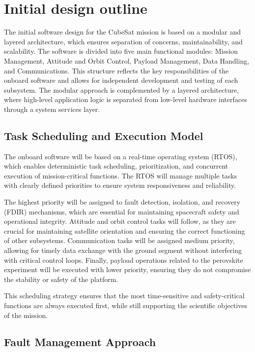 \section{Initial design outline}

The initial software design for the CubeSat mission is based on a modular and layered architecture, which ensures separation of concerns, maintainability, and scalability. The software is divided into five main functional modules: Mission Management, Attitude and Orbit Control, Payload Management, Data Handling, and Communications. This structure reflects the key responsibilities of the onboard software and allows for independent development and testing of each subsystem. The modular approach is complemented by a layered architecture, where high-level application logic is separated from low-level hardware interfaces through a system services layer.

\subsection{Task Scheduling and Execution Model}

The onboard software will be based on a real-time operating system (RTOS), which enables deterministic task scheduling, prioritization, and concurrent execution of mission-critical functions. The RTOS will manage multiple tasks with clearly defined priorities to ensure system responsiveness and reliability.

The highest priority will be assigned to fault detection, isolation, and recovery (FDIR) mechanisms, which are essential for maintaining spacecraft safety and operational integrity. Attitude and orbit control tasks will follow, as they are crucial for maintaining satellite orientation and ensuring the correct functioning of other subsystems. Communication tasks will be assigned medium priority, allowing for timely data exchange with the ground segment without interfering with critical control loops. Finally, payload operations related to the perovskite experiment will be executed with lower priority, ensuring they do not compromise the stability or safety of the platform.

This scheduling strategy ensures that the most time-sensitive and safety-critical functions are always executed first, while still supporting the scientific objectives of the mission.

\subsection{Fault Management Approach}

